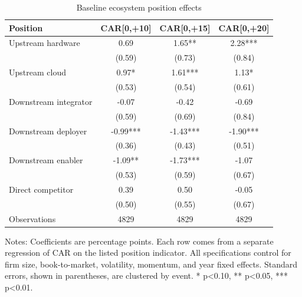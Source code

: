 \begin{table}[!htbp]
\centering
\small
\caption{Baseline ecosystem position effects}
\label{tab:baseline_position_effects}
\begin{tabular}{lccc}
\toprule
Position & CAR[0,+10] & CAR[0,+15] & CAR[0,+20]
\\
\midrule
Upstream hardware & 0.69 & 1.65** & 2.28***
\\
 & (0.59) & (0.73) & (0.84)
\\
Upstream cloud & 0.97* & 1.61*** & 1.13*
\\
 & (0.53) & (0.54) & (0.61)
\\
Downstream integrator & -0.07 & -0.42 & -0.69
\\
 & (0.59) & (0.69) & (0.84)
\\
Downstream deployer & -0.99*** & -1.43*** & -1.90***
\\
 & (0.36) & (0.43) & (0.51)
\\
Downstream enabler & -1.09** & -1.73*** & -1.07
\\
 & (0.53) & (0.59) & (0.67)
\\
Direct competitor & 0.39 & 0.50 & -0.05
\\
 & (0.50) & (0.55) & (0.67)
\\
\midrule
Observations & 4829 & 4829 & 4829
\\
\bottomrule
\end{tabular}
\begin{minipage}{0.94\linewidth}\vspace{0.4em}\footnotesize Notes: Coefficients are percentage points. Each row comes from a separate regression of CAR on the listed position indicator. All specifications control for firm size, book-to-market, volatility, momentum, and year fixed effects. Standard errors, shown in parentheses, are clustered by event. * p<0.10, ** p<0.05, *** p<0.01.\end{minipage}
\end{table}

